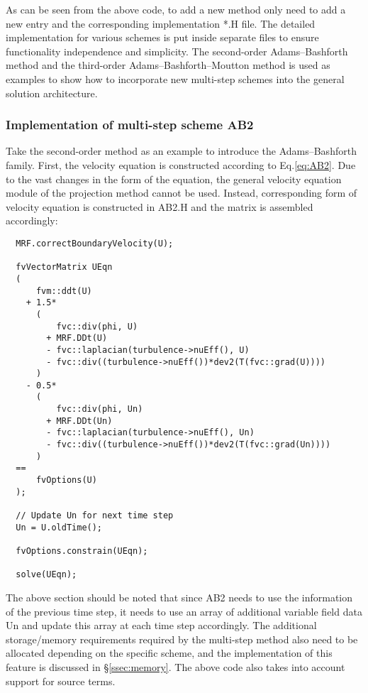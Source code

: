 \documentclass{article}
\begin{document}
As can be seen from the above code, to add a new method only need to add a new entry and the corresponding implementation *.H file. The detailed implementation for various schemes is put inside separate files to ensure functionality independence and simplicity. The second-order Adams--Bashforth method and the third-order Adams--Bashforth--Moutton method is used as examples to show how to incorporate new multi-step schemes into the general solution architecture.


\subsubsection{Implementation of multi-step scheme AB2}
\label{ssec:realizeAB2}

Take the second-order method as an example to introduce the Adams--Bashforth family. First, the velocity equation is constructed according to Eq.\eqref{eq:AB2}. Due to the vast changes in the form of the equation, the general velocity equation module of the projection method cannot be used. Instead, corresponding form of velocity equation is constructed in AB2.H and the matrix is assembled accordingly:

\begin{lstlisting}
  MRF.correctBoundaryVelocity(U);

  fvVectorMatrix UEqn
  (
      fvm::ddt(U)
    + 1.5*
      (
          fvc::div(phi, U)
        + MRF.DDt(U)
        - fvc::laplacian(turbulence->nuEff(), U)
        - fvc::div((turbulence->nuEff())*dev2(T(fvc::grad(U))))
      )
    - 0.5*
      (
          fvc::div(phi, Un)
        + MRF.DDt(Un)
        - fvc::laplacian(turbulence->nuEff(), Un)
        - fvc::div((turbulence->nuEff())*dev2(T(fvc::grad(Un))))
      )
  ==
      fvOptions(U)
  );

  // Update Un for next time step
  Un = U.oldTime();

  fvOptions.constrain(UEqn);

  solve(UEqn);
\end{lstlisting}

The above section should be noted that since AB2 needs to use the information of the previous time step, it needs to use an array of additional variable field data Un and update this array at each time step accordingly. The additional storage/memory requirements required by the multi-step method also need to be allocated depending on the specific scheme, and the implementation of this feature is discussed in \S\ref{ssec:memory}. The above code also takes into account support for source terms.
\end{document}
